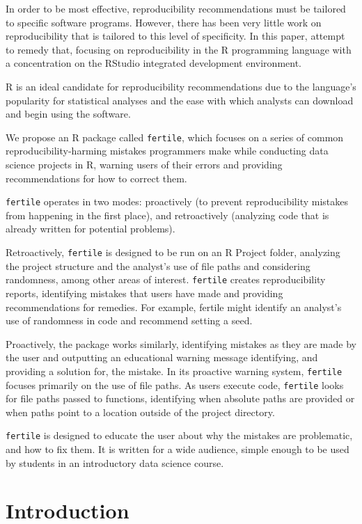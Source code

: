 \documentclass[12pt]{article}
\begin{document}
In order to be most effective, reproducibility recommendations must be
tailored to specific software programs. However, there has been very
little work on reproducibility that is tailored to this level of
specificity. In this paper, attempt to remedy that, focusing on
reproducibility in the R programming language with a concentration on
the RStudio integrated development environment.

R is an ideal candidate for reproducibility recommendations due to the
language's popularity for statistical analyses and the ease with which
analysts can download and begin using the software.

We propose an R package called \texttt{fertile}, which focuses on a
series of common reproducibility-harming mistakes programmers make while
conducting data science projects in R, warning users of their errors and
providing recommendations for how to correct them.

\texttt{fertile} operates in two modes: proactively (to prevent
reproducibility mistakes from happening in the first place), and
retroactively (analyzing code that is already written for potential
problems).

Retroactively, \texttt{fertile} is designed to be run on an R Project
folder, analyzing the project structure and the analyst's use of file
paths and considering randomness, among other areas of interest.
\texttt{fertile} creates reproducibility reports, identifying mistakes
that users have made and providing recommendations for remedies. For
example, fertile might identify an analyst's use of randomness in code
and recommend setting a seed.

Proactively, the package works similarly, identifying mistakes as they
are made by the user and outputting an educational warning message
identifying, and providing a solution for, the mistake. In its proactive
warning system, \texttt{fertile} focuses primarily on the use of file
paths. As users execute code, \texttt{fertile} looks for file paths
passed to functions, identifying when absolute paths are provided or
when paths point to a location outside of the project directory.

\texttt{fertile} is designed to educate the user about why the mistakes
are problematic, and how to fix them. It is written for a wide audience,
simple enough to be used by students in an introductory data science
course.

\section{Introduction}\label{introduction}
\end{document}
